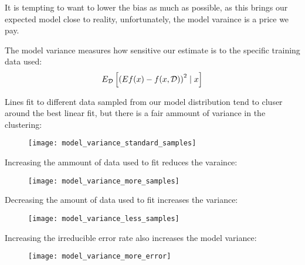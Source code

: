 %
%
\begin{frame}
  It is tempting to want to lower the bias as much as possible, as this brings
  our expected model close to reality, unfortunately, the model varaince is a
  price we pay.
\end{frame}
%
%
\begin{frame}
  The model variance measures how sensitive our estimate is to the specific
  training data used:
      $$ E_{\operatorname*{\mathcal{D}}} \left[ \left( Ef(x) - f(x,\operatorname*{\mathcal{D}}) \right)^2 \mid x \right] $$
\end{frame}
%
%
\begin{frame}
   Lines fit to different data sampled from our model distribution tend to
   cluser around the best linear fit, but there is a fair ammount of variance in
   the clustering:
  \begin{figure}
    \texttt{[image: model\_variance\_standard\_samples]}
  \end{figure}
\end{frame}
%
%
\begin{frame}
  Increasing the ammount of data used to fit reduces the varaince:
  \begin{figure}
    \texttt{[image: model\_variance\_more\_samples]}
  \end{figure}
\end{frame}
%
%
\begin{frame}
  Decreasing the amount of data used to fit increases the variance:
  \begin{figure}
    \texttt{[image: model\_variance\_less\_samples]}
  \end{figure}
\end{frame}
%
%
\begin{frame}
  Increasing the irreducible error rate also increases the model variance:
  \begin{figure}
    \texttt{[image: model\_variance\_more\_error]}
  \end{figure}
\end{frame}
